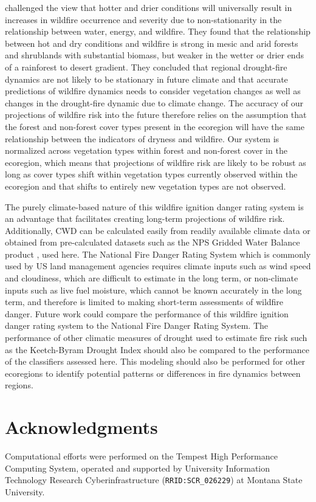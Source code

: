 \documentclass[11p]{article}
\begin{document}
\citet{mckenzieClimateChangeEcohydrology2017} challenged the view that hotter and drier conditions will universally result in increases in wildfire occurrence and severity due to non-stationarity in the relationship between water, energy, and wildfire. They found that the relationship between hot and dry conditions and wildfire is strong in mesic and arid forests and shrublands with substantial biomass, but weaker in the wetter or drier ends of a rainforest to desert gradient.  They concluded that regional drought-fire dynamics are not likely to be stationary in future climate and that accurate predictions of wildfire dynamics needs to consider vegetation changes  as well as changes in the drought-fire dynamic due to climate change. The accuracy of our projections of wildfire risk into the future therefore relies on the assumption that the forest and non-forest cover types present in the ecoregion will have the same relationship between the indicators of dryness and wildfire. Our system is normalized across vegetation types within forest and non-forest cover in the ecoregion, which means that projections of wildfire risk are likely to be robust as long as cover types shift within vegetation types currently observed within the ecoregion and that shifts to entirely new vegetation types are not observed.

The purely climate-based nature of this wildfire ignition danger rating system is an advantage that facilitates creating long-term projections of wildfire risk. Additionally, CWD can be calculated easily from readily available climate data or obtained from pre-calculated datasets such as the NPS Gridded Water Balance product \citep{tercekHistoricalChangesPlant2021}, used here. The National Fire Danger Rating System \citep{degrootChapter11Wildland2015} which is commonly used by US land management agencies requires climate inputs such as wind speed and cloudiness, which are difficult to estimate in the long term, or non-climate inputs such as live fuel moisture, which cannot be known accurately in the long term, and therefore is limited to making short-term assessments of wildfire danger. Future work could compare the performance of this wildfire ignition danger rating system to the National Fire Danger Rating System. The performance of other climatic measures of drought used to estimate fire risk such as the Keetch-Byram Drought Index \citep{degrootChapter11Wildland2015} should also be compared to the performance of the classifiers assessed here.  This modeling should also be performed for other ecoregions to identify potential patterns or differences in fire dynamics between regions. 

\section{Acknowledgments}

Computational efforts were performed on the Tempest High Performance Computing System, operated and supported by University Information Technology Research Cyberinfrastructure (\texttt{RRID:SCR\_026229}) at Montana State University.

\clearpage

\printbibliography[
heading=bibintoc,
title={References}
]
\end{document}
